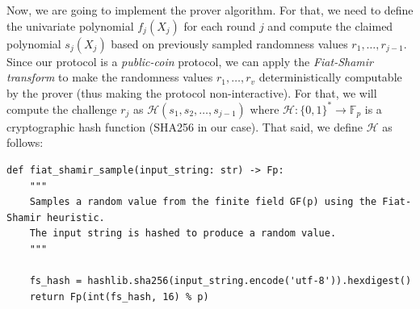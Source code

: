 \documentclass{gkr-template}
\begin{document}
Now, we are going to implement the prover algorithm. For that, we need to define
the univariate polynomial $f_j(X_j)$ for each round $j$ and compute the claimed
polynomial $s_j(X_j)$ based on previously sampled randomness values
$r_1,\dots,r_{j-1}$. Since our protocol is a \textit{public-coin} protocol, we
can apply the \textit{Fiat-Shamir transform} to make the randomness values
$r_1,\dots,r_v$ deterministically computable by the prover (thus making the
protocol non-interactive). For that, we will compute the challenge $r_j$ as
$\mathcal{H}(s_1, s_2, \dots, s_{j-1})$ where $\mathcal{H}: \{0,1\}^* \to
\mathbb{F}_p$ is a cryptographic hash function (SHA256 in our case). That 
said, we define $\mathcal{H}$ as follows:
\begin{verbatim}
def fiat_shamir_sample(input_string: str) -> Fp:
    """
    Samples a random value from the finite field GF(p) using the Fiat-Shamir heuristic.
    The input string is hashed to produce a random value.
    """

    fs_hash = hashlib.sha256(input_string.encode('utf-8')).hexdigest()
    return Fp(int(fs_hash, 16) % p)
\end{verbatim}
\end{document}
